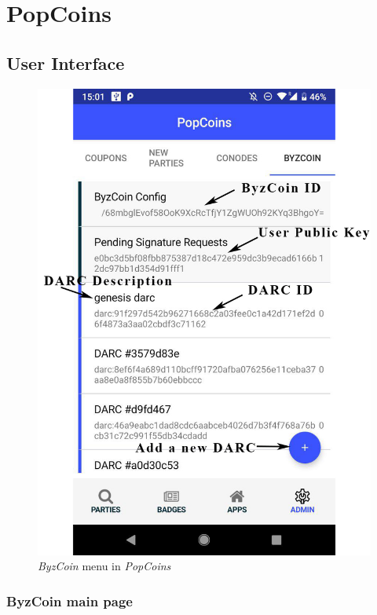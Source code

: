 \section{PopCoins}

\subsection{User Interface}

\begin{figure}[!h]
    \centering
    \includegraphics[height=1.4\linewidth]{Illustrations/screen_byzcoinmenu.jpg}
    \caption{\textit{ByzCoin} menu in \textit{PopCoins}}
\end{figure}

\subsubsection{ByzCoin main page}

